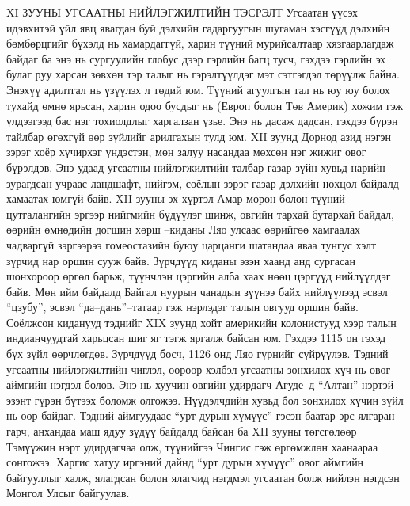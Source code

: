 XI ЗУУНЫ УГСААТНЫ НИЙЛЭГЖИЛТИЙН ТЭСРЭЛТ
Угсаатан үүсэх идэвхитэй үйл явц явагдан буй дэлхийн гадаргуугын шугаман хэсгүүд дэлхийн бөмбөрцгийг бүхэлд нь хамардаггүй, харин түүний мурийсалтаар хязгаарлагдаж байдаг ба энэ нь сургуулийн глобус дээр гэрлийн багц тусч, гэхдээ гэрлийн эх булаг руу харсан зөвхөн тэр талыг нь гэрэлтүүлдэг мэт сэтгэгдэл төрүүлж байна. Энэхүү адилтгал нь үзүүлэх л төдий юм. Түүний агуулгын тал нь юу юу болох тухайд өмнө ярьсан, харин одоо бусдыг нь (Европ болон Төв Америк) хожим гэж үлдээгээд бас нэг тохиолдлыг харгалзан үзье. Энэ нь дасаж дадсан, гэхдээ бүрэн тайлбар өгөхгүй өөр зүйлийг арилгахын тулд юм.
XII зуунд Дорнод азид нэгэн зэрэг хоёр хүчирхэг үндэстэн, мөн залуу насандаа мөхсөн нэг жижиг овог бүрэлдэв. Энэ удаад угсаатны нийлэгжилтийн талбар газар зүйн хувьд нарийн зурагдсан учраас ландшафт, нийгэм, соёлын зэрэг газар дэлхийн нөхцөл байдалд хамаатах юмгүй байв.
XII зууны эх хүртэл Амар мөрөн болон түүний цутгалангийн эргээр нийгмийн бүдүүлэг шинж, овгийн тархай бутархай байдал, өөрийн өмнөдийн догшин хөрш –киданы Ляо улсаас өөрийгөө хамгаалах чадваргүй зэргээрээ гомеостазийн буюу царцанги шатандаа яваа тунгус хэлт зүрчид нар оршин сууж байв. Зүрчдүүд киданы эзэн хаанд анд сургасан шонхороор өргөл барьж, түүнчлэн цэргийн алба хаах нөөц цэргүүд нийлүүлдэг байв.
Мөн ийм байдалд Байгал нуурын чанадын зүүнээ байх нийлүүлээд эсвэл “цзубу”, эсвэл “да–дань”–татаар гэж нэрлэдэг талын овгууд оршин байв. Соёлжсон киданууд тэднийг XIX зуунд хойт америкийн колонистууд хээр талын индианчуудтай харьцсан шиг яг тэгж яргалж байсан юм.
Гэхдээ 1115 он гэхэд бүх зүйл өөрчлөгдөв. Зүрчдүүд босч, 1126 онд Ляо гүрнийг сүйрүүлэв. Тэдний угсаатны нийлэгжилтийн чиглэл, өөрөөр хэлбэл угсаатны зонхилох хүч нь овог аймгийн нэгдэл болов. Энэ нь хуучин овгийн удирдагч Агуде–д “Алтан” нэртэй эзэнт гүрэн бүтээх боломж олгожээ.
Нүүдэлчдийн хувьд бол зонхилох хүчин зүйл нь өөр байдаг. Тэдний аймгуудаас “урт дурын хүмүүс” гэсэн баатар эрс ялгаран гарч, анхандаа маш ядуу зүдүү байдалд байсан ба XII зууны төгсгөлөөр Тэмүүжин нэрт удирдагчаа олж, түүнийгээ Чингис гэж өргөмжлөн хаанаараа сонгожээ. Харгис хатуу иргэний дайнд “урт дурын хүмүүс” овог аймгийн байгууллыг халж, ялагдсан болон ялагчид нэгдмэл угсаатан болж нийлэн нэгдсэн Монгол Улсыг байгуулав.
